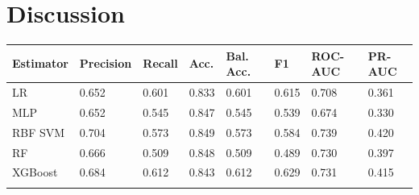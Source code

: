 \section{Discussion}

% 

\begin{longtable}{llllllll} \toprule \midrule \small Estimator & \small Precision & \small Recall & \small Acc. & \small Bal. Acc. & \small F1 & \small ROC-AUC & \small PR-AUC\\ \hline \endhead LR & 0.652 & 0.601 & 0.833 & 0.601 & 0.615 & 0.708 & 0.361\\ MLP & 0.652 & 0.545 & 0.847 & 0.545 & 0.539 & 0.674 & 0.330\\ RBF SVM & 0.704 & 0.573 & 0.849 & 0.573 & 0.584 & 0.739 & 0.420\\ RF & 0.666 & 0.509 & 0.848 & 0.509 & 0.489 & 0.730 & 0.397\\ XGBoost & 0.684 & 0.612 & 0.843 & 0.612 & 0.629 & 0.731 & 0.415\\ \bottomrule \label{table:hitcall_classification_Feature_Selection_XGBClassifier_val_default_macro_avg} \end{longtable}










